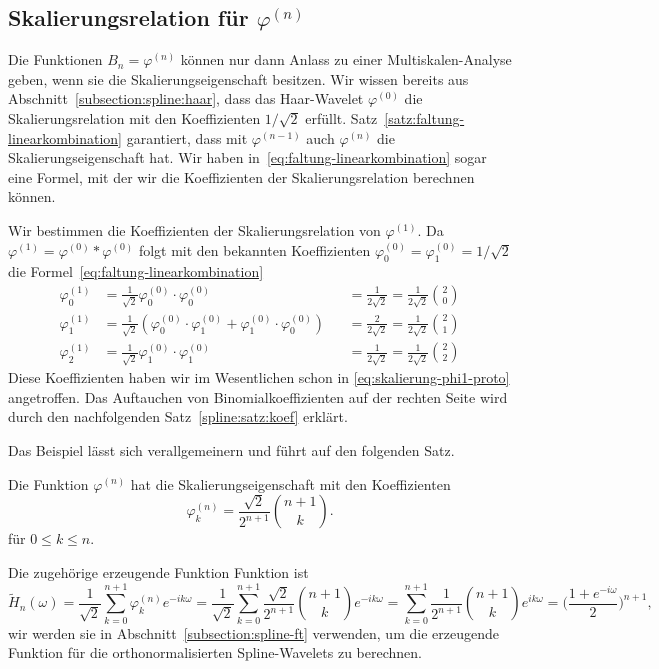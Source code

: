 \subsection{Skalierungsrelation für $\varphi^{(n)}$
\label{subsection:skalierungsrelation-phin}}
Die Funktionen $B_n=\varphi^{(n)}$ können nur dann Anlass zu einer
Multiskalen-Analyse geben, wenn sie die Skalierungseigenschaft
besitzen.
Wir wissen bereits aus Abschnitt~\ref{subsection:spline:haar},
dass das Haar-Wavelet $\varphi^{(0)}$ die Skalierungsrelation
mit den Koeffizienten $1/\sqrt{2}$ erfüllt.
Satz~\ref{satz:faltung-linearkombination} garantiert, dass mit
$\varphi^{(n-1)}$ auch $\varphi^{(n)}$ die Skalierungseigenschaft hat.
Wir haben in~\eqref{eq:faltung-linearkombination}
sogar eine Formel, mit der wir die Koeffizienten der Skalierungsrelation
berechnen können.

\begin{beispiel}
Wir bestimmen die Koeffizienten der Skalierungsrelation von $\varphi^{(1)}$.
Da $\varphi^{(1)}=\varphi^{(0)}*\varphi^{(0)}$ folgt mit den bekannten
Koeffizienten $\varphi^{(0)}_0=\varphi^{(0)}_1=1/\sqrt{2}$ die
Formel~\eqref{eq:faltung-linearkombination}
\[
\begin{aligned}
\varphi^{(1)}_0
&=
\frac1{\sqrt{2}}
\varphi^{(0)}_0
\cdot
\varphi^{(0)}_0
&&=
\frac{1}{2\sqrt{2}}
=\frac{1}{2\sqrt{2}}\binom{2}{0}
\\
\varphi^{(1)}_1
&=
\frac1{\sqrt{2}}
(
\varphi^{(0)}_0
\cdot
\varphi^{(0)}_1
+
\varphi^{(0)}_1
\cdot
\varphi^{(0)}_0
)
&&=
\frac{2}{2\sqrt{2}}
=\frac{1}{2\sqrt{2}}\binom{2}{1}
\\
\varphi^{(1)}_2
&=
\frac1{\sqrt{2}}
\varphi^{(0)}_1
\cdot
\varphi^{(0)}_1
&&=
\frac{1}{2\sqrt{2}}
=\frac{1}{2\sqrt{2}}\binom{2}{2}
\end{aligned}
\]
Diese Koeffizienten haben wir im Wesentlichen schon in
\eqref{eq:skalierung-phi1-proto} angetroffen.
Das Auftauchen von Binomialkoeffizienten auf der rechten Seite wird
durch den nachfolgenden Satz~\ref{spline:satz:koef} erklärt.
\end{beispiel}

Das Beispiel lässt sich verallgemeinern und führt auf den folgenden Satz.

\begin{satz}
\label{spline:satz:koef}
Die Funktion $\varphi^{(n)}$ hat die Skalierungseigenschaft  mit den
Koeffizienten
\[
\varphi^{(n)}_k = \frac{\sqrt{2}}{2^{n+1}}\binom{n+1}{k}.
\]
für $0\le k\le n$.
\end{satz}
Die zugehörige erzeugende Funktion Funktion ist
\begin{equation}
\tilde{H}_n(\omega)
=
\frac{1}{\sqrt{2}}
\sum_{k=0}^{n+1}
\varphi_k^{(n)} e^{-ik\omega}
=
\frac{1}{\sqrt{2}}
\sum_{k=0}^{n+1}
\frac{\sqrt{2}}{2^{n+1}}
\binom{n+1}{k}
e^{-ik\omega}
=
\sum_{k=0}^{n+1}
\frac{1}{2^{n+1}}
\binom{n+1}{k}
e^{ik\omega}
=
\biggl(
\frac{1+e^{-i\omega}}{2}
\biggr)^{n+1},
\end{equation}
wir werden sie in Abschnitt~\ref{subsection:spline-ft} verwenden,
um die erzeugende Funktion für die orthonormalisierten Spline-Wavelets
zu berechnen.


